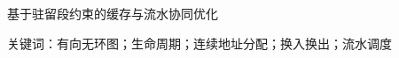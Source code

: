 \documentclass[fontset=windows,12pt,a4paper]{ctexart}
\begin{document}
\songti
\setcounter{page}{1}
\begin{center}{\heiti 基于驻留段约束的缓存与流水协同优化}\par
{}\end{center}

\par\noindent 关键词：有向无环图；生命周期；连续地址分配；换入换出；流水调度
\clearpage










\clearpage
\appendix
{}

\end{document}
